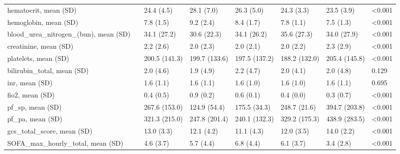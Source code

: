 \begin{tabular}{llllllll}
hematocrit, mean (SD) &        &                    24.4 (4.5) &     28.1 (7.0) &     26.3 (5.0) &     24.3 (3.3) &     23.5 (3.9) &  <0.001 \\
hemoglobin, mean (SD) &        &                     7.8 (1.5) &      9.2 (2.4) &      8.4 (1.7) &      7.8 (1.1) &      7.5 (1.3) &  <0.001 \\
blood\_urea\_nitrogen\_(bun), mean (SD) &        &                   34.1 (27.2) &    30.6 (22.3) &    34.1 (26.2) &    35.6 (27.3) &    34.0 (27.9) &  <0.001 \\
creatinine, mean (SD) &        &                     2.2 (2.6) &      2.0 (2.3) &      2.0 (2.1) &      2.0 (2.2) &      2.3 (2.9) &  <0.001 \\
platelets, mean (SD) &        &                 200.5 (141.3) &  199.7 (133.6) &  197.5 (137.2) &  188.2 (132.0) &  205.4 (145.8) &  <0.001 \\
bilirubin\_total, mean (SD) &        &                     2.0 (4.6) &      1.9 (4.9) &      2.2 (4.7) &      2.0 (4.1) &      2.0 (4.8) &   0.129 \\
inr, mean (SD) &        &                     1.6 (1.1) &      1.6 (1.1) &      1.6 (1.0) &      1.6 (1.0) &      1.6 (1.1) &   0.695 \\
fio2, mean (SD) &        &                     0.4 (0.5) &      0.9 (0.2) &      0.6 (0.1) &      0.4 (0.0) &      0.3 (0.7) &  <0.001 \\
pf\_sp, mean (SD) &        &                 267.6 (153.0) &   124.9 (54.4) &   175.5 (34.3) &   248.7 (21.6) &  394.7 (203.8) &  <0.001 \\
pf\_pa, mean (SD) &        &                 321.3 (215.0) &  247.8 (201.4) &  240.1 (132.3) &  329.2 (175.3) &  438.9 (283.5) &  <0.001 \\
gcs\_total\_score, mean (SD) &        &                    13.0 (3.3) &     12.1 (4.2) &     11.1 (4.3) &     12.0 (3.5) &     14.0 (2.2) &  <0.001 \\
SOFA\_max\_hourly\_total, mean (SD) &        &                     4.6 (3.7) &      5.7 (4.4) &      6.8 (4.4) &      6.1 (3.7) &      3.4 (2.8) &  <0.001 \\
\bottomrule
\end{tabular}
